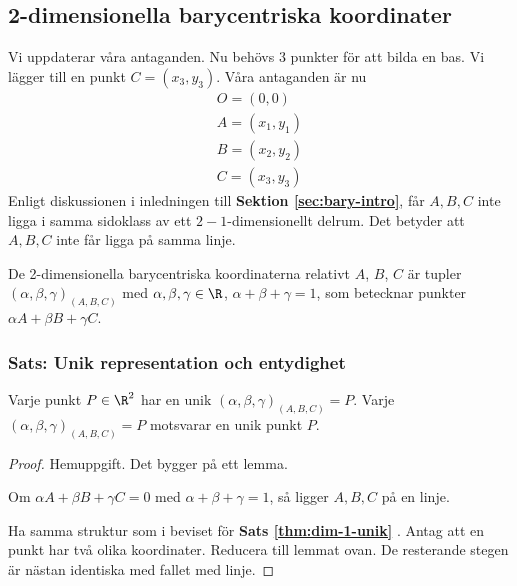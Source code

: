 
\subsection{2-dimensionella barycentriska koordinater}

Vi uppdaterar våra antaganden. Nu behövs $3$ punkter för att bilda en bas.
Vi lägger till en punkt $C = (x_3, y_3)$. Våra antaganden är nu
\begin{eqnarray*}
O = (0, 0) \\
A = (x_1, y_1) \\
B = (x_2, y_2) \\
C = (x_3, y_3)
\end{eqnarray*}
Enligt diskussionen i inledningen till \textbf{Sektion \ref{sec:bary-intro}},
får $A, B, C$ inte ligga i samma sidoklass av ett $2-1$-dimensionellt delrum.
Det betyder att $A, B, C$ inte får ligga på samma linje.

\begin{Definition}
De 2-dimensionella barycentriska koordinaterna relativt $A$, $B$, $C$ är tupler $(\alpha, \beta, \gamma)_{(A,B,C)}$ med
$\alpha, \beta, \gamma \in \R$, $\alpha + \beta + \gamma = 1$, som betecknar punkter $\alpha A + \beta B + \gamma C$.
\end{Definition}

\subsubsection{Sats: Unik representation och entydighet}
\begin{theorem}
Varje punkt $P \in \R^2$ har en unik
$(\alpha, \beta, \gamma)_{(A,B,C)} = P$. Varje $(\alpha,\beta,\gamma)_{(A,B,C)} = P$ motsvarar en unik punkt $P$.
\end{theorem}
\begin{proof}

Hemuppgift. Det bygger på ett lemma.

\smallLine

Om $\alpha A + \beta B + \gamma C = 0$ med $\alpha + \beta + \gamma = 1$, så ligger
    $A, B, C$ på en linje.

\smallLine

Ha samma struktur som i beviset för {\textbf{Sats \ref{thm:dim-1-unik} }}.
Antag att en punkt har två olika koordinater. Reducera till lemmat ovan. De resterande stegen 
är nästan identiska med fallet med linje.
\end{proof}

